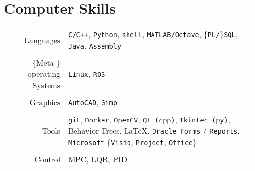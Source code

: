 \documentclass[a4paper,10pt,twoside]{article}
\begin{document}







\section{Computer Skills}

\begin{tabular}{rp{9cm}}
  Languages & \texttt{C/C++}, \texttt{Python}, \texttt{shell}, \texttt{MATLAB/Octave}, $\{$\texttt{PL/}$\}$\texttt{SQL}, \texttt{Java}, \texttt{Assembly}\\
&\\
  $\{$Meta-$\}$operating Systems & \texttt{Linux}, \texttt{ROS} \\
&\\
  Graphics & \texttt{AutoCAD}, \texttt{Gimp}\\
&\\
  Tools & \texttt{git}, \texttt{Docker}, \texttt{OpenCV}, \texttt{Qt (cpp)}, \texttt{Tkinter (py)}, Behavior Trees, \LaTeX, \texttt{Oracle Forms} / \texttt{Reports}, \texttt{Microsoft} $\{$\texttt{Visio}, \texttt{Project}, \texttt{Office}$\}$ \\
&\\
  Control & MPC, LQR, PID
\end{tabular}\\


\end{document}
